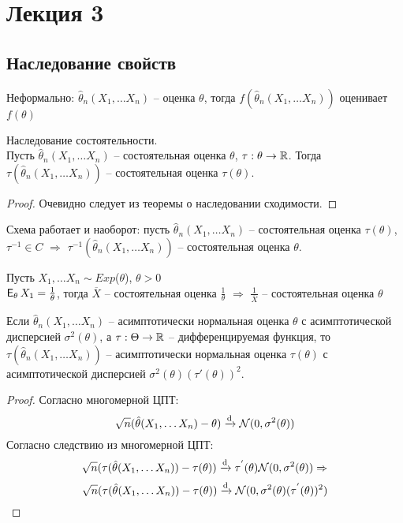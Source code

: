 \section{Лекция 3}

\subsection{Наследование свойств}
Неформально:  $\hat\theta_n(X_1, \ldots X_n)$ -- оценка $\theta$, тогда $f(\hat\theta_n(X_1, \ldots X_n))$ оценивает $f(\theta)$
\begin{proposition}
Наследование состоятельности.\\
Пусть $\hat\theta_n(X_1, \ldots X_n)$ -- состоятельная оценка $\theta$, $\tau:\theta \to \mathbb{R}$. Тогда $\tau(\hat\theta_n(X_1, \ldots X_n))$ -- состоятельная оценка $\tau(\theta)$.
\end{proposition}
\begin{proof}
Очевидно следует из теоремы о наследовании сходимости.
\end{proof}
\begin{remark}
Схема работает и наоборот: пусть $\hat\theta_n(X_1, \ldots X_n)$ -- состоятельная оценка $\tau(\theta)$, $\tau^{-1} \in C$ $\Rightarrow$ $\tau^{-1}(\hat\theta_n(X_1, \ldots X_n))$ -- состоятельная оценка $\theta$.
\end{remark}

\begin{example}
Пусть $X_1, \ldots X_n \sim Exp$($\theta$), $\theta > 0$\\
$\E_{\theta}X_1 = \frac{1}{\theta}$, тогда $\overline{X}$ -- состоятельная оценка $\frac{1}{\theta}$ $\Rightarrow$ $\frac{1}{\overline{X}}$ -- состоятельная оценка $\theta$
\end{example}

\begin{proposition}
Если $\hat\theta_n(X_1, \ldots X_n)$ -- асимптотически нормальная оценка $\theta$ с асимптотической дисперсией $\sigma^2(\theta)$, а $\tau:\Theta \to \mathbb{R}$ -- дифференцируемая функция, то $\tau(\hat\theta_n(X_1, \ldots X_n))$ -- асимптотически нормальная оценка $\tau(\theta)$ с асимптотической дисперсией $\sigma^2(\theta)(\tau'(\theta))^2.$
\end{proposition}

\begin{proof}
Согласно многомерной ЦПТ:
$$
\sqrt{n}(\hat\theta(X_1, \ldots X_n) - \theta) \xrightarrow{\mathrm{d}} \mathcal{N}(0, \sigma^2(\theta))
$$
Согласно следствию из многомерной ЦПТ:
$$
\sqrt{n}(\tau(\hat\theta(X_1, \ldots X_n)) - \tau(\theta)) \xrightarrow{\mathrm{d}} \tau^{'}(\theta)\mathcal{N}(0, \sigma^2(\theta)) \Rightarrow
$$
$$
\sqrt{n}(\tau(\hat\theta(X_1, \ldots X_n)) - \tau(\theta)) \xrightarrow{\mathrm{d}} \mathcal{N}(0, \sigma^2(\theta)(\tau^{'}(\theta))^2)
$$
\end{proof}

